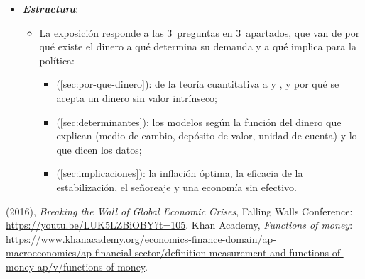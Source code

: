 \documentclass[11pt]{article}
\begin{document}
\begin{itemize}
\item \textbf{\emph{Estructura}}:
  \begin{itemize}
  \item La exposición responde a las 3~preguntas en 3~apartados, que van de por qué existe el dinero a qué determina su demanda y a qué implica para la política:
  \begin{itemize}
  \item {} (\ref{sec:por-que-dinero}): de la teoría cuantitativa a  y , y por qué se acepta un dinero sin valor intrínseco;
  \item {} (\ref{sec:determinantes}): los modelos según la función del dinero que explican (medio de cambio, depósito de valor, unidad de cuenta) y lo que dicen los datos;
  \item {} (\ref{sec:implicaciones}): la inflación óptima, la eficacia de la estabilización, el señoreaje y una economía sin efectivo.
  \end{itemize}
  \end{itemize}
\end{itemize}

\begin{anotaciones}
 (2016), \emph{Breaking the Wall of Global Economic Crises}, Falling Walls Conference: \url{https://youtu.be/LUK5LZBiOBY?t=105}. Khan Academy, \emph{Functions of money}: \url{https://www.khanacademy.org/economics-finance-domain/ap-macroeconomics/ap-financial-sector/definition-measurement-and-functions-of-money-ap/v/functions-of-money}.
\end{anotaciones}
\end{document}
